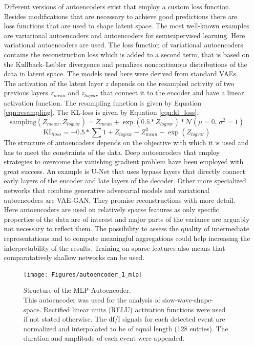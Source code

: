 Different versions of autoencoders exist that employ a custom loss function. Besides modifications that are necessary to achieve good predictions there are loss functions that are used to shape latent space. The most well-known examples are variational autoencoders and autoencoders for semisupervised learning. Here variational autoencoders are used. The loss function of variational autoencoders contains the reconstruction loss which is added to a second term, that is based on the Kullback–Leibler divergence and penalizes noncontinuous distributions of the data in latent space. The models used here were derived from standard VAEs. The activation of the latent layer $z$ depends on the resampled activity of two previous layers $z_{mean}$ and $z_{logvar}$ that connect it to the encoder and have a linear activation function. The resampling function is given by Equation \ref{eqn:resampling}. The KL-loss is given by Equation \ref{eqn:kl_loss}.\\
\begin{equation}
\text{sampling}(Z_{mean}, Z_{log var}) = Z_{mean}+ \exp(0.5 * Z_{log var}) * \mathcal{N}(\mu = 0,\,\sigma^{2}=1)
\label{eqn:resampling}
\end{equation}
\begin{equation}
  \text{KL}_{loss} = -0.5 * \sum 1 + Z_{log var} - Z_{mean}^2 - \exp(Z_{log var})
\label{eqn:kl_loss}
\end{equation}
The structure of autoencoders depends on the objective with which it is used and has to meet the constraints of the data. Deep autoencoders that employ strategies to overcome the vanishing gradient problem have been employed with great success. An example is U-Net that uses bypass layers that directly connect early layers of the encoder and late layers of the decoder. Other more specialized networks that combine generative adversarial models and variational autoencoders are VAE-GAN. They promise reconstructions with more detail. Here autoencoders are used on relatively sparse features as only specific properties of the data are of interest and major parts of the variance are arguably not necessary to reflect them. The possibility to assess the quality of intermediate representations and to compute meaningful aggregations could help increasing the interpretability of the results. Training on sparse features also means that comparatatively shallow networks can be used.\\
\begin{figure}[!htb]
\centering
\texttt{[image: Figures/autoencoder\_1\_mlp]}
\decoRule
\caption[Structure of the MLP Autoencoder]{Structure of the MLP-Autoencoder.\\ This autoencoder was used for the analysis of slow-wave-shape-space. Rectified linear units (RELU) activation functions were used if not stated otherwise. The df/f signals for each detected event are normalized and interpolated to be of equal length (128 entries). The duration and amplitude of each event were appended.}
\label{fig:autoencoder_1_mlp}
\end{figure}
